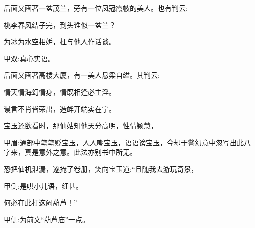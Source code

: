 \begin{parag}
    后面又画著一盆茂兰，旁有一位凤冠霞帔的美人。也有判云:
\end{parag}


\begin{poem}
    \begin{pl}桃李春风结子完，到头谁似一盆兰？\end{pl}

    \begin{pl}为冰为水空相妒，枉与他人作话谈。\end{pl}
    \begin{note}甲双:真心实语。\end{note}

\end{poem}


\begin{parag}
    后面又画著高楼大厦，有一美人悬梁自缢。其判云:
\end{parag}


\begin{poem}
    \begin{pl}情天情海幻情身，情既相逢必主淫。\end{pl}

    \begin{pl}谩言不肖皆荣出，造衅开端实在宁。\end{pl}
\end{poem}


\begin{parag}
    宝玉还欲看时，那仙姑知他天分高明，性情颖慧，\begin{note}甲眉:通部中笔笔贬宝玉，人人嘲宝玉，语语谤宝玉，今却于警幻意中忽写出此八字来，真是意外之意。此法亦别书中所无。\end{note}恐把仙机泄漏，遂掩了卷册，笑向宝玉道:“且随我去游玩奇景，\begin{note}甲侧:是哄小儿语，细甚。\end{note}何必在此打这闷葫芦！”\begin{note}甲侧:为前文“葫芦庙”一点。\end{note}
\end{parag}


